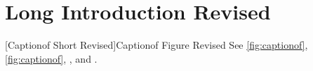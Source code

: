 \section[Renamed Intro]{Long Introduction Revised}\label{sec:intro}
[Captionof Short Revised]{Captionof Figure Revised}\label{fig:captionof}
See \autoref{fig:captionof}, \cref{fig:captionof}, , and .
